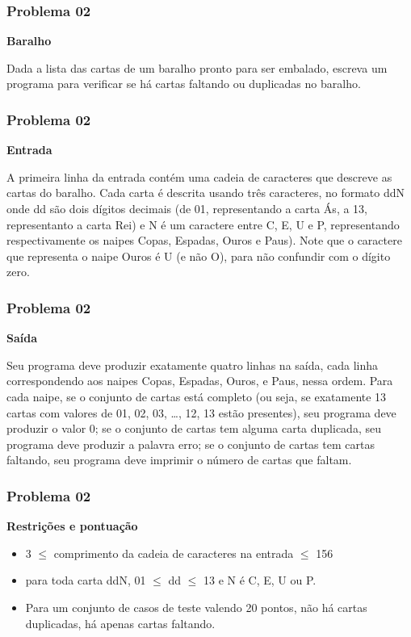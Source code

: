\documentclass{beamer}
\begin{document}
\begin{frame}
\frametitle{Problema 02}
\textbf{Baralho}\vspace{0.2cm}

Dada a lista das cartas de um baralho pronto para ser embalado, escreva um programa para verificar se há cartas faltando ou duplicadas no baralho. 
\end{frame}

\begin{frame}
\frametitle{Problema 02}
\textbf{Entrada}\vspace{0.2cm}

A primeira linha da entrada contém uma cadeia de caracteres que descreve as cartas do baralho. Cada carta é descrita usando três caracteres, no formato ddN onde dd são dois dígitos decimais (de 01, representando a carta Ás, a 13, representanto a carta Rei) e N é um caractere entre C, E, U e P, representando respectivamente os naipes Copas, Espadas, Ouros e Paus). Note que o caractere que representa o naipe Ouros é U (e não O), para não confundir com o dígito zero. 

\end{frame}

\begin{frame}
\frametitle{Problema 02}
\textbf{Saída}\vspace{0.2cm}

Seu programa deve produzir exatamente quatro linhas na saída, cada linha correspondendo aos naipes Copas, Espadas, Ouros, e Paus, nessa ordem. Para cada naipe, se o conjunto de cartas está completo (ou seja, se exatamente 13 cartas com valores de 01, 02, 03, …, 12, 13 estão presentes), seu programa deve produzir o valor 0; se o conjunto de cartas tem alguma carta duplicada, seu programa deve produzir a palavra erro; se o conjunto de cartas tem cartas faltando, seu programa deve imprimir o número de cartas que faltam.

\end{frame}

\begin{frame}
\frametitle{Problema 02}
\textbf{Restrições e pontuação}\vspace{0.2cm}

\begin{itemize}
    \item 3 $\leq$ comprimento da cadeia de caracteres na entrada $\leq$ 156 
    \item para toda carta ddN, 01 $\leq$ dd $\leq$ 13 e N é C, E, U ou P. 
    \item Para um conjunto de casos de teste valendo 20 pontos, não há cartas duplicadas, há apenas cartas faltando.
\end{itemize}

\end{frame}
\end{document}
